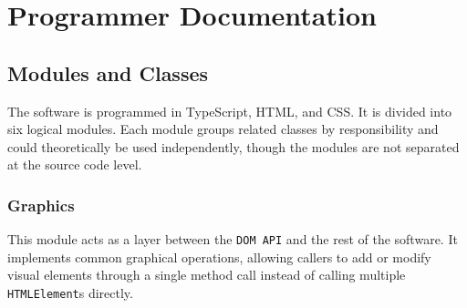 \chapter{Programmer Documentation}\label{ch:c}

\section{Modules and Classes}

The software is programmed in TypeScript, HTML, and CSS\@.
It is divided into six logical modules.
Each module groups related classes by responsibility and could theoretically be used independently,
though the modules are not separated at the source code level.


\subsection*{Graphics}

This module acts as a layer between the \texttt{DOM API} and the rest of the software.
It implements common graphical operations, allowing callers to add or modify visual elements
through a single method call instead of calling multiple \texttt{HTMLElement}s directly.


